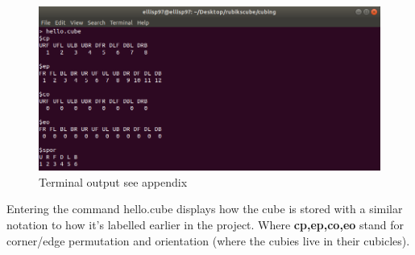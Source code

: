 \documentclass{article}
\begin{document}
\begin{figure}[h]
	\centering
	\includegraphics[scale=.5]{terminalcube.png}
	\caption{Terminal output see appendix}
\end{figure}
Entering the command hello.cube displays how the cube is stored with a similar notation to how it's labelled earlier in the project. Where \textbf{cp,ep,co,eo} stand for corner/edge permutation and orientation (where the cubies live in their cubicles).
\end{document}
